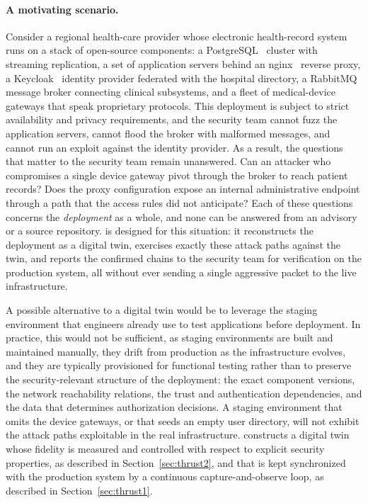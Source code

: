 \paragraph{A motivating scenario.}
Consider a regional health-care provider whose electronic health-record
system runs on a stack of open-source components: a
PostgreSQL~\cite{postgresql} cluster with streaming replication, a set of
application servers behind an nginx~\cite{nginx} reverse proxy, a
Keycloak~\cite{keycloak} identity provider federated with the hospital
directory, a RabbitMQ~\cite{rabbitmq} message broker connecting clinical
subsystems, and a fleet of medical-device gateways that speak proprietary
protocols. This deployment is subject to strict availability and privacy
requirements, and the security team cannot fuzz the application
servers, cannot flood the broker with malformed messages, and cannot run an
exploit against the identity provider. As a result, the questions that matter to the security team remain
unanswered. Can an attacker who compromises a
single device gateway pivot through the broker to reach patient records? Does
the proxy configuration expose an internal administrative endpoint through a
path that the access rules did not anticipate? Each of these questions concerns the \emph{deployment} as a whole, and none can be answered from an advisory or a source repository. \sysname is designed for this situation: it reconstructs the deployment as a
digital twin, exercises exactly these attack paths against the twin, and
reports the confirmed chains to the security team for verification on the
production system, all without ever sending a single aggressive packet to the
live infrastructure.

A possible alternative to a digital twin would be to leverage the staging
environment that engineers already use to test applications before
deployment. In practice, this would not be sufficient, as staging
environments are built and maintained manually, they drift from production as
the infrastructure evolves, and they are typically provisioned for functional
testing rather than to preserve the security-relevant structure of the
deployment: the exact component versions, the network reachability relations,
the trust and authentication dependencies, and the data that determines
authorization decisions. A staging environment that omits the device gateways, or that seeds an empty user directory, will not exhibit the attack paths exploitable in the real infrastructure. \sysname constructs a digital twin whose fidelity is measured and controlled
with respect to explicit security properties, as described in
Section~\ref{sec:thrust2}, and that is kept synchronized with the production
system by a continuous capture-and-observe loop, as described in
Section~\ref{sec:thrust1}.

